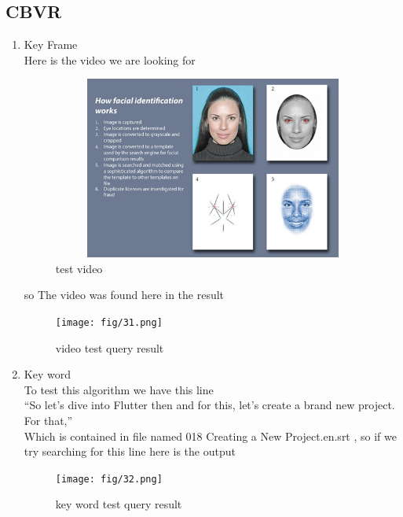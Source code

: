 \documentclass[pdftex,10pt,a4paper,oneside]{article}
\begin{document}
\subsection{CBVR}
\begin{enumerate}
	\item Key Frame\\
	Here is the video we are looking for 
	\begin{figure}[H]
		\centering
		\includegraphics[width=120mm,height=60mm]{fig/30.png}
		\caption{test video }
		\label{test video}
	\end{figure}
so The video was found here in the result
\begin{figure}[H]
	\centering
	\texttt{[image: fig/31.png]}
	\caption{video test query result }
	\label{video test query result}
\end{figure}
\pagebreak
\item Key word \\
To test this algorithm we have this line\\
“So let's dive into Flutter then and for this, let's create a brand new project. For that,”\\
Which is contained  in file named 018 Creating a New Project.en.srt , so if we try searching for this line here is the output
\begin{figure}[H]
	\centering
	\texttt{[image: fig/32.png]}
	\caption{key word test query result }
	\label{key word test query result}
\end{figure}
\end{enumerate}
	\pagebreak
\end{document}
